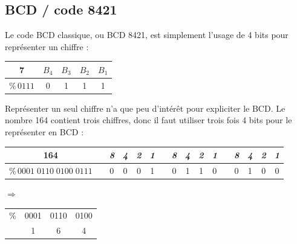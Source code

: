 \documentclass[11pt,a4paper]{article}
\begin{document}
\bigskip


\subsection{BCD / code 8421}

Le code BCD classique, ou BCD 8421, est simplement l'usage de 4 bits pour représenter un chiffre :

\begin{center}
\begin{tabular}{ c  | c | c | c | c | }
7                 & $B_{4}$ & $B_{3}$ & $B_{2}$ & $B_{1}$ \\
\hline
$ \text{\%} \, 0111 $ & 0 & 1 & 1 & 1 \\
\end{tabular}
\end{center}

Représenter un seul chiffre n'a que peu d'intérêt pour expliciter le BCD.
Le nombre 164 contient trois chiffres, donc il faut utiliser trois fois 4 bits pour le représenter en BCD :

\begin{center}
\begin{tabular}{ c | m{0.25cm} | c | c | c | c | m{0.25cm} | c | c | c | c | m{0.25cm} | c | c | c | c | }
164 & \cellcolor{black!15} & \textit{8} & \textit{4} & \textit{2} & \textit{1} & \cellcolor{black!15} & \textit{8} & \textit{4} & \textit{2} & \textit{1} & \cellcolor{black!15} & \textit{8} & \textit{4} & \textit{2} & \textit{1} \\
\hline
$ \text{\%} \, 0001 \; 0110 \; 0100 \; 0111 $ & \cellcolor{black!15} & 0 & 0 & 0 & 1 & \cellcolor{black!15} & 0 & 1 & 1 & 0 & \cellcolor{black!15} & 0 & 1 & 0 & 0 \\
\end{tabular}
\end{center}

\begin{table}[!ht]
  \centering
  \begin{minipage}{0.35\textwidth}
    \raggedleft

$ \Rightarrow $

  \end{minipage}
  \hfillx
  \begin{minipage}{0.60\textwidth}
    \raggedright

\begin{tabular}{ c  c c c }
\% & 0001 & 0110 & 0100 \\
   &    1 &    6 &    4 \\
\end{tabular}

  \end{minipage}
\end{table}
\end{document}
